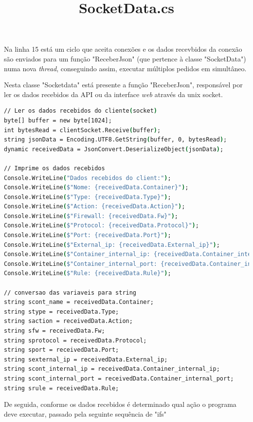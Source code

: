 Na linha 15 está um ciclo que aceita conexões e os dados recevbidos da conexão
são enviados para um função "ReceberJson" (que pertence à classe "SocketData") 
numa nova \textit{thread}, conseguindo assim, executar múltiplos 
pedidos em simultâneo. \\


\title*{\textbf{SocketData.cs}}


Nesta classe "Socketdata" está presente a função "ReceberJson", responsável por ler 
os dados recebidos da API ou da interface \textit{web} através da unix socket.

\begin{lstlisting}[language=csh, caption={Leitura dos dados recebidos}]
// Ler os dados recebidos do cliente(socket)
byte[] buffer = new byte[1024];
int bytesRead = clientSocket.Receive(buffer);
string jsonData = Encoding.UTF8.GetString(buffer, 0, bytesRead);
dynamic receivedData = JsonConvert.DeserializeObject(jsonData);

// Imprime os dados recebidos
Console.WriteLine("Dados recebidos do client:");
Console.WriteLine($"Nome: {receivedData.Container}");
Console.WriteLine($"Type: {receivedData.Type}");
Console.WriteLine($"Action: {receivedData.Action}");
Console.WriteLine($"Firewall: {receivedData.Fw}");
Console.WriteLine($"Protocol: {receivedData.Protocol}");
Console.WriteLine($"Port: {receivedData.Port}");
Console.WriteLine($"External_ip: {receivedData.External_ip}");
Console.WriteLine($"Container_internal_ip: {receivedData.Container_internal_ip}");
Console.WriteLine($"Container_internal_port: {receivedData.Container_internal_port}");
Console.WriteLine($"Rule: {receivedData.Rule}");

// conversao das variaveis para string
string scont_name = receivedData.Container;
string stype = receivedData.Type;
string saction = receivedData.Action;
string sfw = receivedData.Fw;
string sprotocol = receivedData.Protocol;
string sport = receivedData.Port;
string sexternal_ip = receivedData.External_ip;
string scont_internal_ip = receivedData.Container_internal_ip;
string scont_internal_port = receivedData.Container_internal_port;
string srule = receivedData.Rule;
\end{lstlisting}  


De seguida, conforme os dados recebidos é determinado qual ação o programa deve executar,
passado pela seguinte sequência de "ifs"


